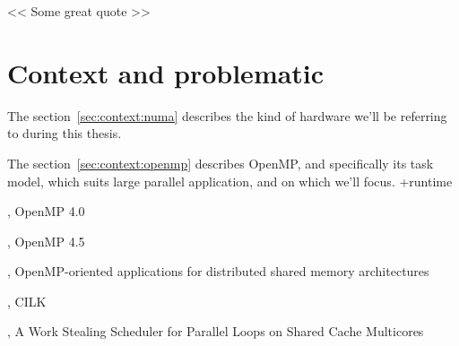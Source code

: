 \begin{savequote}[6cm]
<< Some great quote  >>
\end{savequote}
\chapter{Context and problematic}
\chaptertoc

The section~\ref{sec:context:numa} describes the kind of hardware we'll be referring to during this thesis.

The section~\ref{sec:context:openmp} describes OpenMP, and specifically its task model, which suits large parallel application, and on which we'll focus.
+runtime





\cite{openmp40}, OpenMP 4.0

\cite{openmp45}, OpenMP 4.5

\cite{Marowka2004}, OpenMP-oriented applications for distributed shared memory architectures

\cite{cilk5}, CILK

\cite{Tchiboukdjian2010}, A Work Stealing Scheduler for Parallel Loops on Shared Cache Multicores

